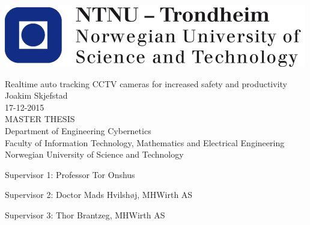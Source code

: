 \thispagestyle{empty}

\includegraphics[scale=0.35]{NTNULogo.png}

\begin{center}
\Huge{Realtime auto tracking CCTV cameras for increased safety and productivity}\\[2pc]

\Large{Joakim Skjefstad}\\[1pc]
\large{17-12-2015}\\[2pc]

MASTER THESIS\\
Department of Engineering Cybernetics\\
Faculty of Information Technology, Mathematics and Electrical Engineering\\
Norwegian University of Science and Technology
\end{center}
\vfill

\noindent Supervisor 1: Professor Tor Onshus

\noindent Supervisor 2: Doctor Mads Hvilshøj, MHWirth AS

\noindent Supervisor 3: Thor Brantzeg, MHWirth AS

\newpage
\thispagestyle{empty}
\mbox{}
\newpage